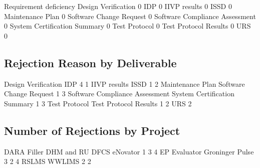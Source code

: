 \documentclass{article}
\begin{document}
\begin{Schunk}
\begin{Soutput}
                                 Requirement deficiency
  Design Verification                                 0
  IDP                                                 0
  IIVP results                                        0
  ISSD                                                0
  Maintenance Plan                                    0
  Software Change Request                             0
  Software Compliance Assessment                      0
  System Certification Summary                        0
  Test Protocol                                       0
  Test Protocol Results                               0
  URS                                                 0
\end{Soutput}
\end{Schunk}


\subsection{Rejection Reason by Deliverable}

\begin{Schunk}
\begin{Soutput}
           Design Verification                            IDP 
                             4                              1 
                  IIVP results                           ISSD 
                             1                              2 
              Maintenance Plan        Software Change Request 
                             1                              3 
Software Compliance Assessment   System Certification Summary 
                             1                              3 
                 Test Protocol          Test Protocol Results 
                             1                              2 
                           URS 
                             2 
\end{Soutput}
\end{Schunk}

\subsection{Number of Rejections by Project}

\begin{Schunk}
\begin{Soutput}
DARA Filler DHM and RU                   DFCS               eNovator 
                     1                      3                      4 
          EP Evaluator              Groninger                  Pulse 
                     3                      2                      4 
                 RSLMS                 WWLIMS 
                     2                      2 
\end{Soutput}
\end{Schunk}
\end{document}
